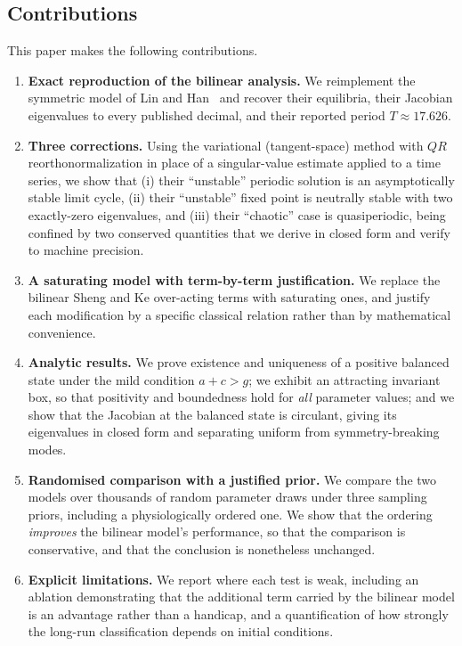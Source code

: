 \documentclass[11pt]{article}
\begin{document}
\subsection{Contributions}

This paper makes the following contributions.

\begin{enumerate}
\item \textbf{Exact reproduction of the bilinear analysis.} We reimplement the
symmetric model of Lin and Han~\cite{Lin2020} and recover their equilibria,
their Jacobian eigenvalues to every published decimal, and their reported period
$T\approx 17.626$.

\item \textbf{Three corrections.} Using the variational (tangent-space) method
with $QR$ reorthonormalization in place of a singular-value estimate applied to a
time series, we show that (i) their ``unstable'' periodic solution is an
asymptotically stable limit cycle, (ii) their ``unstable'' fixed point is
neutrally stable with two exactly-zero eigenvalues, and (iii) their ``chaotic''
case is quasiperiodic, being confined by two conserved quantities that we derive
in closed form and verify to machine precision.

\item \textbf{A saturating model with term-by-term justification.} We replace
the bilinear Sheng and Ke over-acting terms with saturating ones, and justify
each modification by a specific classical relation rather than by mathematical
convenience.

\item \textbf{Analytic results.} We prove existence and uniqueness of a positive
balanced state under the mild condition $a+c>g$; we exhibit an attracting
invariant box, so that positivity and boundedness hold for \emph{all} parameter
values; and we show that the Jacobian at the balanced state is circulant,
giving its eigenvalues in closed form and separating uniform from
symmetry-breaking modes.

\item \textbf{Randomised comparison with a justified prior.} We compare the two
models over thousands of random parameter draws under three sampling priors,
including a physiologically ordered one. We show that the ordering
\emph{improves} the bilinear model's performance, so that the comparison is
conservative, and that the conclusion is nonetheless unchanged.

\item \textbf{Explicit limitations.} We report where each test is weak, including
an ablation demonstrating that the additional term carried by the bilinear model
is an advantage rather than a handicap, and a quantification of how strongly the
long-run classification depends on initial conditions.
\end{enumerate}
\end{document}
